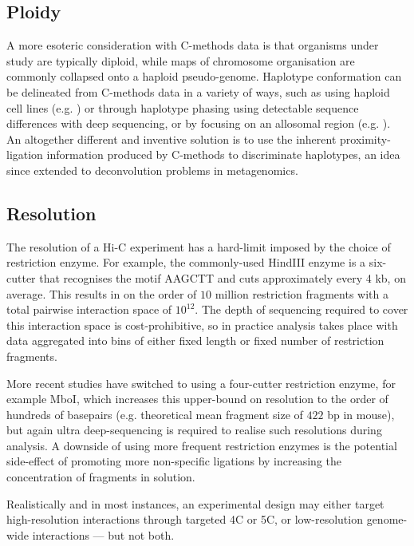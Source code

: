 \documentclass[a4paper,11pt,oneside]{book}
\begin{document}
\subsection{Ploidy}
A more esoteric consideration with C-methods data is that organisms under study are typically diploid, while maps of chromosome organisation are commonly collapsed onto a haploid pseudo-genome. Haplotype conformation can be delineated from C-methods data in a variety of ways, such as using haploid cell lines (e.g. ) or through haplotype phasing using detectable sequence differences with deep sequencing, or by focusing on an allosomal region (e.g. ). An altogether different and inventive solution is to use the inherent proximity-ligation information produced by C-methods to discriminate haplotypes,\cite{Selvaraj2013a} an idea since extended to deconvolution problems in metagenomics.\cite{Burton2014, Beitel2014}

\subsection{Resolution}
The resolution of a Hi-C experiment has a hard-limit imposed by the choice of restriction enzyme. For example, the commonly-used HindIII enzyme is a six-cutter that recognises the motif AAGCTT and cuts approximately every 4 kb, on average.\cite{DeWit2012} This results in on the order of $10$ million restriction fragments with a total pairwise interaction space of $10^{12}$.\cite{Lajoie2014} The depth of sequencing required to cover this interaction space is cost-prohibitive, so in practice analysis takes place with data aggregated into bins of either fixed length or fixed number of restriction fragments. 

More recent studies have switched to using a four-cutter restriction enzyme, for example MboI,\cite{Rao2014} which increases this upper-bound on resolution to the order of hundreds of basepairs (e.g. theoretical mean fragment size of $422$ bp in mouse\cite{Sahlen2015}), but again ultra deep-sequencing is required to realise such resolutions during analysis. A downside of using more frequent restriction enzymes is the potential side-effect of promoting more non-specific ligations by increasing the concentration of fragments in solution.\cite{Rao2014} 

Realistically and in most instances, an experimental design may either target high-resolution interactions through targeted 4C or 5C, or low-resolution genome-wide interactions --- but not both.
\end{document}
